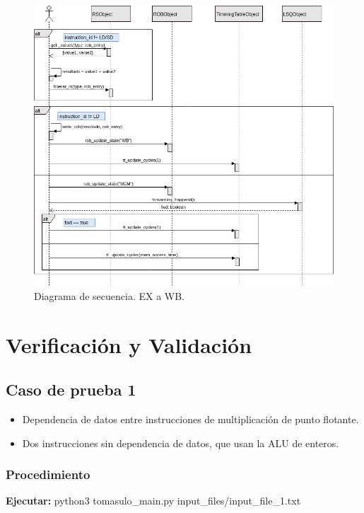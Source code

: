 \documentclass[a4paper]{article}
\begin{document}
	\begin{figure}[H]
		\centering
		\includegraphics[width=1\textwidth]{figures/ex_wb.png}
		\caption{\label{fig:ex_wb}Diagrama de secuencia. EX a WB.}
	\end{figure}

	
	\section{Verificación y Validación}

	\subsection*{Caso de prueba 1}

	\begin{itemize}
		\item Dependencia de datos entre instrucciones de multiplicación de punto flotante.
		\item Dos instrucciones sin dependencia de datos, que usan la ALU de enteros. 
	\end{itemize}

	\subsubsection*{Procedimiento}

	\textbf{Ejecutar:} python3 tomasulo\_main.py input\_files/input\_file\_1.txt
\end{document}
